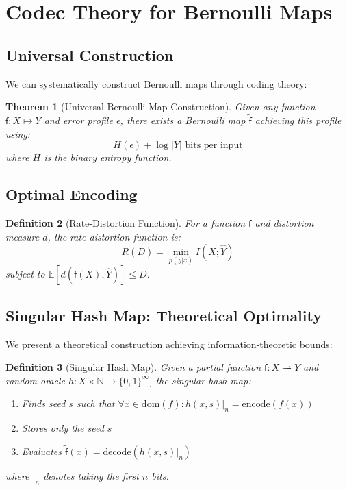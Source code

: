 \documentclass[11pt,final,hidelinks]{article}
\newtheorem{theorem}{Theorem}[section]
\newtheorem{definition}[theorem]{Definition}
\newcommand{\obs}[1]{\widetilde{#1}}  %
\newcommand{\Fun}[1]{\mathsf{#1}}     %
\newcommand{\AFun}[1]{\obs{\mathsf{#1}}}  %
\newcommand{\Set}[1]{#1}              %
\newcommand{\Expect}[1]{\mathbb{E}\left[#1\right]}
\newcommand{\error}{\epsilon}
\newcommand{\pfun}{\rightharpoonup}
\begin{document}
\section{Codec Theory for Bernoulli Maps}

\subsection{Universal Construction}

We can systematically construct Bernoulli maps through coding theory:

\begin{theorem}[Universal Bernoulli Map Construction]
Given any function $\Fun{f} : \Set{X} \mapsto \Set{Y}$ and error profile $\error$, there exists a Bernoulli map $\AFun{f}$ achieving this profile using:
\begin{equation}
H(\error) + \log |\Set{Y}| \text{ bits per input}
\end{equation}
where $H$ is the binary entropy function.
\end{theorem}

\subsection{Optimal Encoding}

\begin{definition}[Rate-Distortion Function]
For a function $\Fun{f}$ and distortion measure $d$, the rate-distortion function is:
\begin{equation}
R(D) = \min_{p(\hat{y}|x)} I(X; \hat{Y})
\end{equation}
subject to $\Expect{d(\Fun{f}(X), \hat{Y})} \leq D$.
\end{definition}

\subsection{Singular Hash Map: Theoretical Optimality}

We present a theoretical construction achieving information-theoretic bounds:

\begin{definition}[Singular Hash Map]
Given a partial function $\Fun{f}: \Set{X} \pfun \Set{Y}$ and random oracle $h: \Set{X} \times \mathbb{N} \to \{0,1\}^\infty$, the singular hash map:
\begin{enumerate}
    \item Finds seed $s$ such that $\forall x \in \text{dom}(f): h(x,s)|_n = \text{encode}(f(x))$
    \item Stores only the seed $s$
    \item Evaluates $\AFun{f}(x) = \text{decode}(h(x,s)|_n)$
\end{enumerate}
where $|_n$ denotes taking the first $n$ bits.
\end{definition}
\end{document}
